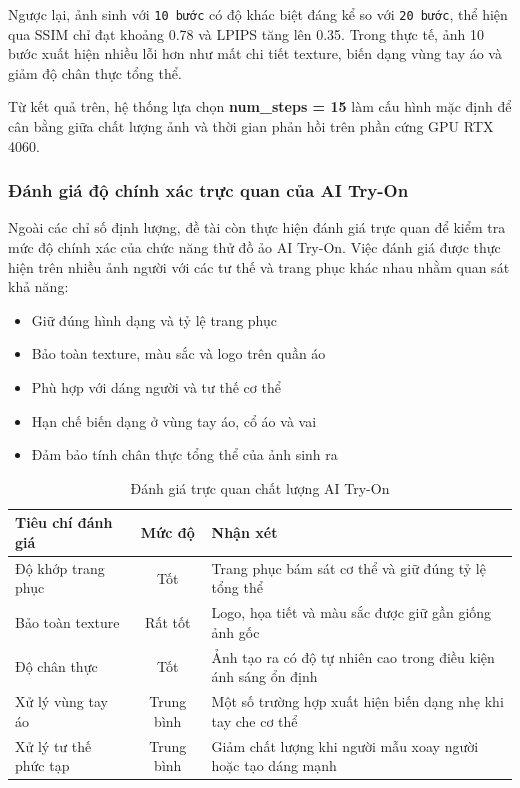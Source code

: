 Ngược lại, ảnh sinh với \texttt{10 bước} có độ khác biệt đáng kể so với
\texttt{20 bước}, thể hiện qua SSIM chỉ đạt khoảng 0.78 và LPIPS tăng lên
0.35. Trong thực tế, ảnh 10 bước xuất hiện nhiều lỗi hơn như mất chi tiết
texture, biến dạng vùng tay áo và giảm độ chân thực tổng thể.

Từ kết quả trên, hệ thống lựa chọn \textbf{num\_steps = 15} làm cấu hình mặc định
để cân bằng giữa chất lượng ảnh và thời gian phản hồi trên phần cứng GPU RTX 4060.

\subsubsection{Đánh giá độ chính xác trực quan của AI Try-On}

Ngoài các chỉ số định lượng, đề tài còn thực hiện đánh giá trực quan
để kiểm tra mức độ chính xác của chức năng thử đồ ảo AI Try-On.
Việc đánh giá được thực hiện trên nhiều ảnh người với các tư thế và
trang phục khác nhau nhằm quan sát khả năng:

\begin{itemize}
    \item Giữ đúng hình dạng và tỷ lệ trang phục
    \item Bảo toàn texture, màu sắc và logo trên quần áo
    \item Phù hợp với dáng người và tư thế cơ thể
    \item Hạn chế biến dạng ở vùng tay áo, cổ áo và vai
    \item Đảm bảo tính chân thực tổng thể của ảnh sinh ra
\end{itemize}

\begin{table}[H]
\centering
\caption{Đánh giá trực quan chất lượng AI Try-On}
\label{tab:visual_quality}
\renewcommand{\arraystretch}{1.4}
\begin{tabular}{|p{4cm}|c|p{6cm}|}
\hline
\textbf{Tiêu chí đánh giá} & \textbf{Mức độ} & \textbf{Nhận xét} \\
\hline
Độ khớp trang phục & Tốt &
Trang phục bám sát cơ thể và giữ đúng tỷ lệ tổng thể \\
\hline
Bảo toàn texture & Rất tốt &
Logo, họa tiết và màu sắc được giữ gần giống ảnh gốc \\
\hline
Độ chân thực & Tốt &
Ảnh tạo ra có độ tự nhiên cao trong điều kiện ánh sáng ổn định \\
\hline
Xử lý vùng tay áo & Trung bình &
Một số trường hợp xuất hiện biến dạng nhẹ khi tay che cơ thể \\
\hline
Xử lý tư thế phức tạp & Trung bình &
Giảm chất lượng khi người mẫu xoay người hoặc tạo dáng mạnh \\
\hline
\end{tabular}
\end{table}

